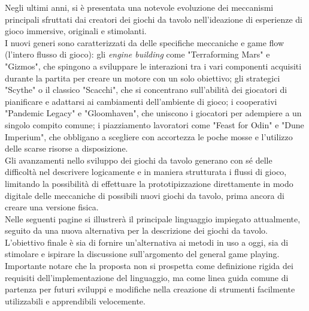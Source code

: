Negli ultimi anni, si è presentata una notevole evoluzione dei meccanismi principali sfruttati dai
creatori dei giochi da tavolo nell'ideazione di esperienze di gioco immersive, originali e stimolanti. \\
I nuovi generi sono caratterizzati da delle specifiche meccaniche e game flow (l'intero flusso di gioco):
gli \emph{engine building} come "Terraforming Mars" e "Gizmos", che spingono a sviluppare le interazioni 
tra i vari componenti acquisiti durante la partita per creare un motore con un solo obiettivo;
gli strategici "Scythe" o il classico "Scacchi", che si concentrano sull'abilità dei giocatori di pianificare 
e adattarsi ai cambiamenti dell'ambiente di gioco; i cooperativi "Pandemic Legacy" e "Gloomhaven", che uniscono i giocatori per adempiere a un 
singolo compito comune; i piazziamento lavoratori come "Feast for Odin" e "Dune Imperium", che obbligano a scegliere 
con accortezza le poche mosse e l'utilizzo delle scarse risorse a disposizione. \\
Gli avanzamenti nello sviluppo dei giochi da tavolo generano con sé delle difficoltà nel descrivere logicamente 
e in maniera strutturata i flussi di gioco, limitando la possibilità di effettuare la prototipizzazione 
direttamente in modo digitale delle meccaniche di possibili nuovi giochi da tavolo, 
prima ancora di creare una versione fisica. \\
Nelle seguenti pagine si illustrerà il principale linguaggio impiegato attualmente, 
seguito da una nuova alternativa per la descrizione dei giochi da tavolo. \\
L’obiettivo finale è sia di fornire un’alternativa ai metodi in uso a oggi, 
sia di stimolare e ispirare la discussione sull’argomento del general game playing. \\
Importante notare che la proposta non si prospetta come definizione rigida dei requisiti dell’implementazione 
del linguaggio, ma come linea guida comune di partenza per futuri sviluppi e
modifiche nella creazione di strumenti facilmente utilizzabili e apprendibili velocemente. 

